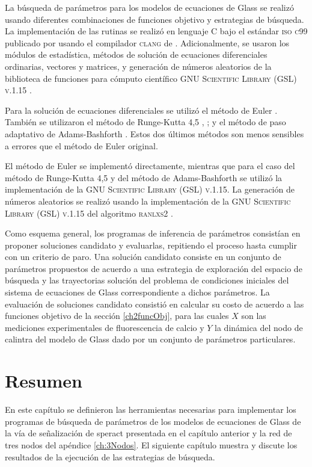 La búsqueda de parámetros para los modelos de ecuaciones de Glass se realizó usando diferentes combinaciones de funciones objetivo y estrategias de búsqueda. La implementación de las rutinas se realizó en lenguaje C \citeauthor{Kernighan1988} \citep{Kernighan1988} bajo el estándar \textsc{iso c99} publicado por  \citeauthor{c99} \citep{c99} usando el compilador \textsc{clang} de \citeauthor{clang} \citep{clang}. Adicionalmente, se usaron los módulos de estadística, métodos de solución de ecuaciones diferenciales ordinarias, vectores y matrices, y generación de números aleatorios de la biblioteca de funciones para cómputo científico \textsc{GNU Scientific Library (GSL) v.1.15} \citeauthor{gslManual} \citep{gslManual}.

Para la solución de ecuaciones diferenciales se utilizó el método de Euler \citeauthor{numrecipesc} \citep{numrecipesc}. También se utilizaron el método de Runge-Kutta 4,5 \citeauthor{numrecipesc} \citep{numrecipesc}, \citeauthor{gslManual} \citep{gslManual}; y el método de paso adaptativo de Adams-Bashforth \citep{gslManual}. Estos dos últimos métodos son menos sensibles a errores que el método de Euler original.

El método de Euler se implementó directamente, mientras que para el caso del método de Runge-Kutta 4,5 y del método de Adams-Bashforth se utilizó la implementación de la \textsc{GNU Scientific Library (GSL) v.1.15}. La generación de números aleatorios se realizó usando la implementación de la \textsc{GNU Scientific Library (GSL) v.1.15} del algoritmo \textsc{ranlxs2} \citeauthor{gslManual} \citep{gslManual}.

Como esquema general, los programas de inferencia de parámetros consistían en proponer soluciones candidato y evaluarlas, repitiendo el proceso hasta cumplir con un criterio de paro. Una solución candidato consiste en un conjunto de parámetros propuestos de acuerdo a una estrategia de exploración del espacio de búsqueda y las trayectorias solución del problema de condiciones iniciales del sistema de ecuaciones de Glass correspondiente a dichos parámetros. La evaluación de soluciones candidato consistió en calcular su costo de acuerdo a las funciones objetivo de la sección \ref{ch2funcObj}, para las cuales $X$ son las mediciones experimentales de fluorescencia de calcio y $Y$ la dinámica del nodo de \ac{calintra} del modelo de Glass dado por un conjunto de parámetros particulares.

\section{Resumen}
En este capítulo se definieron las herramientas necesarias para implementar los programas de búsqueda de parámetros de los modelos de ecuaciones de Glass de la vía de señalización de speract presentada en el capítulo anterior y la red de tres nodos del apéndice \ref{ch:3Nodos}. El siguiente capítulo muestra y discute los resultados de la ejecución de las estrategias de búsqueda.
